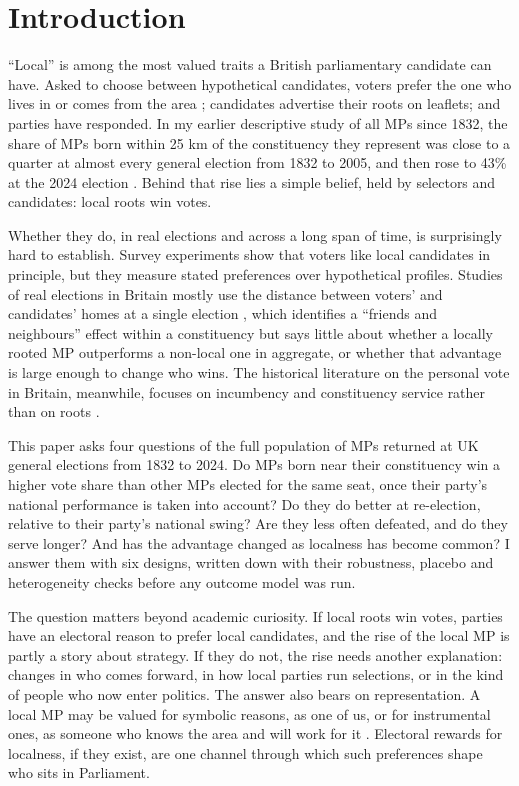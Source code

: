 \documentclass[11pt,a4paper]{article}
\begin{document}
\section{Introduction}
``Local'' is among the most valued traits a British parliamentary candidate can have. Asked to choose between hypothetical candidates, voters prefer the one who lives in or comes from the area \citep{campbellcowley2014,campbell2019}; candidates advertise their roots on leaflets; and parties have responded. In my earlier descriptive study of all MPs since 1832, the share of MPs born within 25 km of the constituency they represent was close to a quarter at almost every general election from 1832 to 2005, and then rose to 43\% at the 2024 election \citep{hotham2026mpl}. Behind that rise lies a simple belief, held by selectors and candidates: local roots win votes.

Whether they do, in real elections and across a long span of time, is surprisingly hard to establish. Survey experiments show that voters like local candidates in principle, but they measure stated preferences over hypothetical profiles. Studies of real elections in Britain mostly use the distance between voters' and candidates' homes at a single election \citep{arzheimerevans2012,arzheimerevans2014,evans2017}, which identifies a ``friends and neighbours'' effect within a constituency but says little about whether a locally rooted MP outperforms a non-local one in aggregate, or whether that advantage is large enough to change who wins. The historical literature on the personal vote in Britain, meanwhile, focuses on incumbency and constituency service rather than on roots \citep{cain1987,gaines1998,eggersspirling2017}.

This paper asks four questions of the full population of MPs returned at UK general elections from 1832 to 2024. Do MPs born near their constituency win a higher vote share than other MPs elected for the same seat, once their party's national performance is taken into account? Do they do better at re-election, relative to their party's national swing? Are they less often defeated, and do they serve longer? And has the advantage changed as localness has become common? I answer them with six designs, written down with their robustness, placebo and heterogeneity checks before any outcome model was run.

The question matters beyond academic curiosity. If local roots win votes, parties have an electoral reason to prefer local candidates, and the rise of the local MP is partly a story about strategy. If they do not, the rise needs another explanation: changes in who comes forward, in how local parties run selections, or in the kind of people who now enter politics. The answer also bears on representation. A local MP may be valued for symbolic reasons, as one of us, or for instrumental ones, as someone who knows the area and will work for it \citep{childscowley2011,campbell2019}. Electoral rewards for localness, if they exist, are one channel through which such preferences shape who sits in Parliament.
\end{document}
